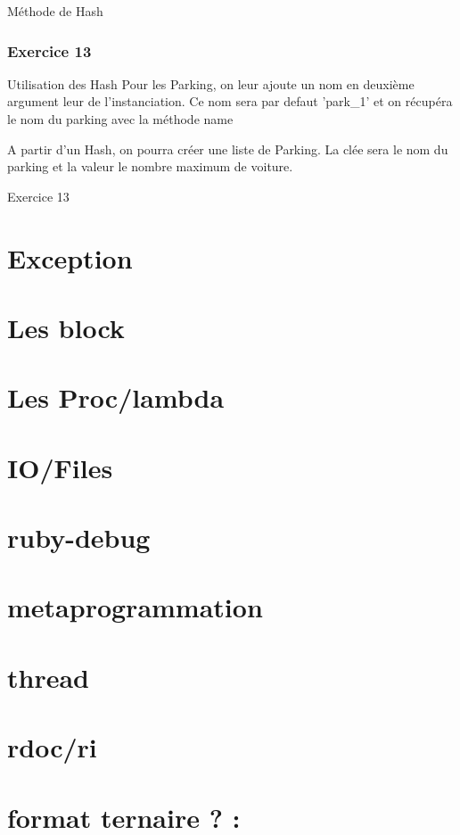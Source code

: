 \documentclass{beamer}
\begin{document}
\begin{frame}
  \begin{beamerboxesrounded}{M\'ethode de Hash}
    
  \end{beamerboxesrounded}
\end{frame}

\begin{frame}
  \frametitle{Exercice 13}
  \begin{block}{Utilisation des Hash}
    Pour les Parking, on leur ajoute un nom en deuxième argument leur de
    l'instanciation. Ce nom sera par defaut 'park\_1' et on r\'ecup\'era le nom
    du parking avec la m\'ethode name

    A partir d'un Hash, on pourra cr\'eer une liste de Parking. La cl\'ee sera le
    nom du parking et la valeur le nombre maximum de voiture.
  \end{block}
\end{frame}

\begin{frame}
  \begin{beamerboxesrounded}{Exercice 13}
    
  \end{beamerboxesrounded}
\end{frame}

\section{Exception}
\section{Les block}
\section{Les Proc/lambda}
\section{IO/Files}
\section{ruby-debug}
\section{metaprogrammation}
\section{thread}
\section{rdoc/ri}
\section{format ternaire ? :}
\end{document}
